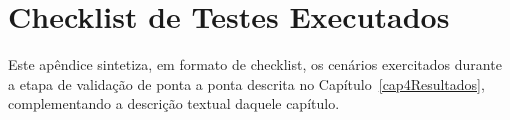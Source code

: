 
\apendices

\chapter{Checklist de Testes Executados}
\label{apendiceChecklist}

Este apêndice sintetiza, em formato de checklist, os cenários exercitados durante a etapa de validação de ponta a ponta descrita no Capítulo~\ref{cap4Resultados}, complementando a descrição textual daquele capítulo.

